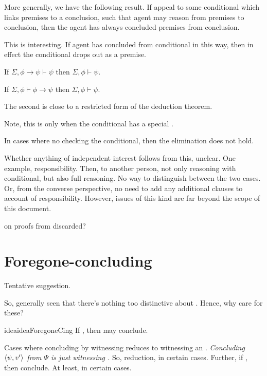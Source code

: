 \begin{note}
  More generally, we have the following result.
  If appeal to some conditional which links premises to a conclusion, such that agent may reason from premises to conclusion, then the agent has always concluded premises from conclusion.

  This is interesting.
  If agent has concluded from conditional in this way, then in effect the conditional drops out as a premise.

  If \(\Sigma, \phi \rightarrow \psi \vdash \psi\) then \(\Sigma, \phi \vdash \psi\).

  If \(\Sigma, \phi \vdash \phi \rightarrow \psi\) then \(\Sigma, \phi \vdash \psi\).

  The second is close to a restricted form of the deduction theorem.

  Note, this is only when the conditional has a special \requ{}.

  In cases where no checking the conditional, then the elimination does not hold.

  Whether anything of independent interest follows from this, unclear.
  One example, responsibility.
  Then, to another person, not only reasoning with conditional, but also full reasoning.
  No way to distinguish between the two cases.
  Or, from the converse perspective, no need to add any additional clauses to account of responsibility.
  However, issues of this kind are far beyond the scope of this document.
\end{note}

\begin{note}
  \citeauthor{Easwaran:2009tm} on proofs from discarded?
\end{note}

\section{Foregone-concluding}

\begin{note}
  Tentative suggestion.
\end{note}

\begin{note}
  So, generally seen that there's nothing too distinctive about .
  Hence, why care for these?

  \begin{restatable}{idea}{ideaForegoneCing}
    \label{idea:reassignment}
    If \fc{}, then may conclude.
  \end{restatable}

  Cases where concluding by witnessing reduces to witnessing an \fc{}.
  \emph{Concluding \(\langle \psi, v' \rangle\) from \(\Psi\) is just witnessing \fc{}.}
  So, reduction, in certain cases.
  Further, if \fc{}, then conclude.
  At least, in certain cases.
\end{note}


